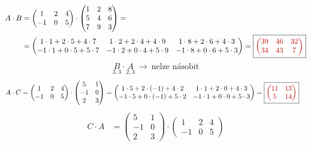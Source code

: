 \documentclass[11pt,a4paper]{article}
\newcommand{\vysl}[1]{\boxed{\color{red!75!black}#1}}
\begin{document}
\newpage
\begin{fleqn}[0pt]
\begin{align*}
A\cdot B &= \begin{pmatrix} 1 & 2 & 4\\ -1 & 0 & 5 \end{pmatrix}\cdot\begin{pmatrix} 1 & 2 & 8\\ 5 & 4 & 6\\ 7 & 9 & 3 \end{pmatrix} =\\
&= \begin{pmatrix} 1\cdot1+2\cdot5+4\cdot7 & 1\cdot2+2\cdot4+4\cdot9 & 1\cdot8+2\cdot6+4\cdot3\\ -1\cdot1+0\cdot5+5\cdot7 & -1\cdot2+0\cdot4+5\cdot9 & -1\cdot8+0\cdot6+5\cdot3 \end{pmatrix}
= \vysl{\begin{pmatrix} 39 & 46 & 32\\ 34 & 43 & 7 \end{pmatrix}}
\end{align*}
\[
\underset{3,3}{B}\cdot\underset{2,3}{A} \ \to\ \text{nelze násobit}
\]
\begin{align*}
A\cdot C &= \begin{pmatrix} 1 & 2 & 4\\ -1 & 0 & 5 \end{pmatrix}\cdot\begin{pmatrix} 5 & 1\\ -1 & 0\\ 2 & 3 \end{pmatrix}
= \begin{pmatrix} 1\cdot5+2\cdot(-1)+4\cdot2 & 1\cdot1+2\cdot0+4\cdot3\\ -1\cdot5+0\cdot(-1)+5\cdot2 & -1\cdot1+0\cdot0+5\cdot3 \end{pmatrix}
= \vysl{\begin{pmatrix} 11 & 13\\ 5 & 14 \end{pmatrix}}
\end{align*}
{\setlength{\arraycolsep}{4.5pt}
\begin{align*}
C\cdot A &= \begin{pmatrix} 5 & 1\\ -1 & 0\\ 2 & 3 \end{pmatrix}\cdot\begin{pmatrix} 1 & 2 & 4\\ -1 & 0 & 5 \end{pmatrix}

\end{align*}}
\end{fleqn}
\end{document}
